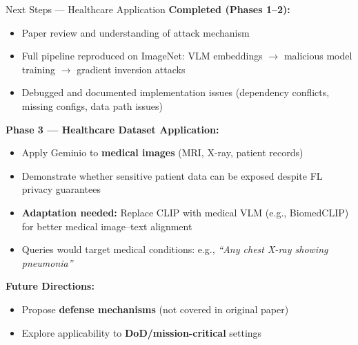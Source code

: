 \documentclass[aspectratio=169]{beamer}
\begin{document}
\begin{frame}{Next Steps --- Healthcare Application}
\textbf{Completed (Phases 1--2):}
\begin{itemize}
    \item[\checkmark] Paper review and understanding of attack mechanism
    \item[\checkmark] Full pipeline reproduced on ImageNet: VLM embeddings $\rightarrow$ malicious model training $\rightarrow$ gradient inversion attacks
    \item[\checkmark] Debugged and documented implementation issues (dependency conflicts, missing configs, data path issues)
\end{itemize}

\vspace{0.4cm}
\textbf{Phase 3 --- Healthcare Dataset Application:}
\begin{itemize}
    \item Apply Geminio to \textbf{medical images} (MRI, X-ray, patient records)
    \item Demonstrate whether sensitive patient data can be exposed despite FL privacy guarantees
    \item \textbf{Adaptation needed:} Replace CLIP with medical VLM (e.g., BiomedCLIP) for better medical image--text alignment
    \item Queries would target medical conditions: e.g., \textit{``Any chest X-ray showing pneumonia''}
\end{itemize}

\vspace{0.4cm}
\textbf{Future Directions:}
\begin{itemize}
    \item Propose \textbf{defense mechanisms} (not covered in original paper)
    \item Explore applicability to \textbf{DoD/mission-critical} settings
\end{itemize}
\end{frame}
\end{document}
